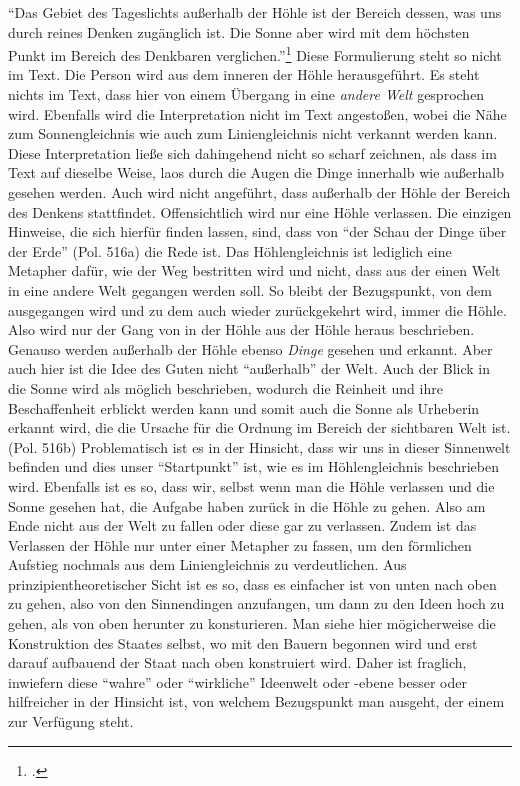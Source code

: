 \enquote{Das Gebiet des Tageslichts außerhalb der Höhle ist der Bereich dessen, was uns durch reines Denken zugänglich ist. Die Sonne aber wird mit dem höchsten Punkt im Bereich des Denkbaren verglichen.}\footcite[][S. 49]{DisseMetaphysik} Diese Formulierung steht so nicht im Text. Die Person wird aus dem inneren der Höhle herausgeführt. Es steht nichts im Text, dass hier von einem Übergang in eine \emph{andere Welt} gesprochen wird. Ebenfalls wird die Interpretation nicht im Text angestoßen, wobei die Nähe zum Sonnengleichnis wie auch zum Liniengleichnis nicht verkannt werden kann. Diese Interpretation ließe sich dahingehend nicht so scharf zeichnen, als dass im Text auf dieselbe Weise, laos durch die Augen die Dinge innerhalb wie außerhalb gesehen werden. Auch wird nicht angeführt, dass außerhalb der Höhle der Bereich des Denkens stattfindet. Offensichtlich wird nur eine Höhle verlassen. Die einzigen Hinweise, die sich hierfür finden lassen, sind, dass von \enquote{der Schau der Dinge über der Erde} (Pol. 516a) die Rede ist. 
Das Höhlengleichnis ist lediglich eine Metapher dafür, wie der Weg bestritten wird und nicht, dass aus der einen Welt in eine andere Welt gegangen werden soll. So bleibt der Bezugspunkt, von dem ausgegangen wird und zu dem auch wieder zurückgekehrt wird, immer die Höhle. Also wird nur der Gang von in der Höhle aus der Höhle heraus beschrieben. Genauso werden außerhalb der Höhle ebenso \emph{Dinge} gesehen und erkannt. Aber auch hier ist die Idee des Guten nicht \enquote{außerhalb} der Welt. Auch der Blick in die Sonne wird als möglich beschrieben, wodurch die Reinheit und ihre Beschaffenheit erblickt werden kann und somit auch die Sonne als Urheberin erkannt wird, die die Ursache für die Ordnung im Bereich der sichtbaren Welt ist. (Pol. 516b)
Problematisch ist es in der Hinsicht, dass wir uns in dieser Sinnenwelt befinden und dies unser \enquote{Startpunkt} ist, wie es im Höhlengleichnis beschrieben wird. Ebenfalls ist es so, dass wir, selbst wenn man die Höhle verlassen und die Sonne gesehen hat, die Aufgabe haben zurück in die Höhle zu gehen. Also am Ende nicht aus der Welt zu fallen oder diese gar zu verlassen. Zudem ist das Verlassen der Höhle nur unter einer Metapher zu fassen, um den förmlichen Aufstieg nochmals aus dem Liniengleichnis zu verdeutlichen.
Aus prinzipientheoretischer Sicht ist es so, dass es einfacher ist von unten nach oben zu gehen, also von den Sinnendingen anzufangen, um dann zu den Ideen hoch zu gehen, als von oben herunter zu konsturieren. Man siehe hier mögicherweise die Konstruktion des Staates selbst, wo mit den Bauern begonnen wird und erst darauf aufbauend der Staat nach oben konstruiert wird. Daher ist fraglich, inwiefern diese \enquote{wahre} oder \enquote{wirkliche} Ideenwelt oder -ebene besser oder hilfreicher in der Hinsicht ist, von welchem Bezugspunkt man ausgeht, der einem zur Verfügung steht. 
